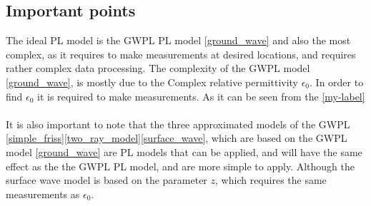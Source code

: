\subsection{Important points}
The ideal PL model is the GWPL PL model \eqref{ground_wave} and also the most complex, as it requires to make measurements at desired locations, and requires rather complex data processing. The complexity of the GWPL model \eqref{ground_wave}, is mostly due to the Complex relative permittivity $\epsilon_{0}$. In order to find $\epsilon_{0}$ it is required to make  measurements. As it can be seen from the \autoref{my-label}
\\
\\
It is also important to note that the three approximated models of the GWPL \eqref{simple_friss}\eqref{two_ray_model}\eqref{surface_wave}, which are based on the GWPL model \eqref{ground_wave} are PL models that can be applied, and will have the same effect as the the GWPL PL model, and are more simple to apply. Although the surface wave model is based on the parameter $z$, which requires the same measurements as $\epsilon_{0}$.
